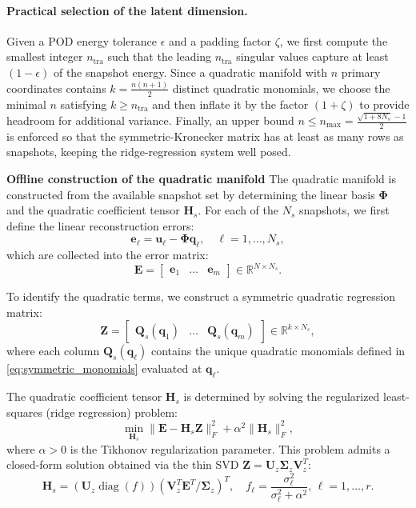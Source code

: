 \paragraph{Practical selection of the latent dimension.}
Given a POD energy tolerance $\epsilon$ and a padding factor $\zeta$, 
we first compute the smallest integer $n_{\text{tra}}$ such that the leading
$n_{\text{tra}}$ singular values capture at least $(1-\epsilon)$ of the
snapshot energy.  
Since a quadratic manifold with $n$ primary coordinates contains
$k=\tfrac{n(n+1)}{2}$ distinct quadratic monomials, we choose the minimal $n$
satisfying $k \ge n_{\text{tra}}$ and then inflate it by the factor
$(1+\zeta)$ to provide headroom for additional variance.  
Finally, an upper bound 
$
n \le n_{\max}=\frac{\sqrt{1+8N_s}-1}{2}
$
is enforced so that the symmetric-Kronecker matrix has at least as many rows
as snapshots, keeping the ridge-regression system well posed.


\textbf{Offline construction of the quadratic manifold} The quadratic manifold is constructed from the available snapshot set by determining the linear basis \(\boldsymbol{\Phi}\) and the quadratic coefficient tensor \(\mathbf{H}_s\). For each of the \(N_s\) snapshots, we first define the linear reconstruction errors:
%
\[
\mathbf{e}_\ell =
\mathbf{u}_\ell - \boldsymbol{\Phi}\mathbf{q}_\ell,
\quad \ell=1,\dots,N_s,
\]
%
which are collected into the error matrix:
%
\[
\mathbf{E} =
\begin{bmatrix}
\mathbf{e}_1 & \dots & \mathbf{e}_m
\end{bmatrix}\in\mathbb{R}^{N\times N_s}.
\]

To identify the quadratic terms, we construct a symmetric quadratic regression matrix:
%
\[
\mathbf{Z} =
\begin{bmatrix}
\mathbf{Q}_s(\mathbf{q}_1) & \dots & \mathbf{Q}_s(\mathbf{q}_m)
\end{bmatrix}\in\mathbb{R}^{k\times N_s},
\]
%
where each column \(\mathbf{Q}_s(\mathbf{q}_\ell)\) contains the unique quadratic monomials defined in \eqref{eq:symmetric_monomials} evaluated at \(\mathbf{q}_\ell\).

The quadratic coefficient tensor \(\mathbf{H}_s\) is determined by solving the regularized least-squares (ridge regression) problem:
%
\[
\min_{\mathbf{H}_s}\|\mathbf{E}-\mathbf{H}_s\mathbf{Z}\|_F^2+\alpha^2\|\mathbf{H}_s\|_F^2,
\]
%
where \(\alpha>0\) is the Tikhonov regularization parameter. This problem admits a closed-form solution obtained via the thin SVD \(\mathbf{Z}= \mathbf{U}_z\boldsymbol{\Sigma}_z\mathbf{V}_z^T\):
%
\begin{equation}
\mathbf{H}_s=
(\mathbf{U}_z\operatorname{diag}(f))
\left(\mathbf{V}_z^T\mathbf{E}^T/\boldsymbol{\Sigma}_z\right)^T,
\quad
f_\ell=\frac{\sigma_\ell^2}{\sigma_\ell^2+\alpha^2},\, \ell=1,\dots,r.
\label{eq:H_closedform}
\end{equation}

